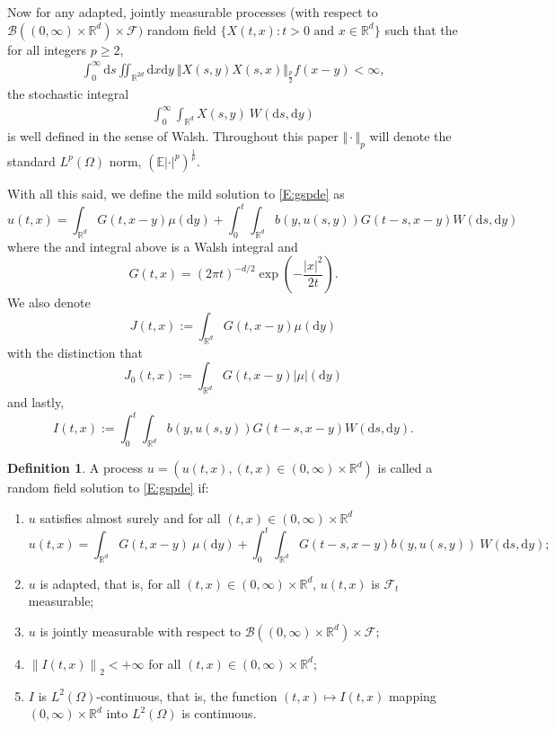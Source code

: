 \documentclass[a4paper,11pt]{article}%
\numberwithin{equation}{section}
\theoremstyle{plain}
\theoremstyle{definition}
\newtheorem{definition}[theorem]{Definition}
\newcommand{\R}{\mathbb{R}}
\newcommand{\E}{\mathbb{E}}
\newcommand{\Norm}[1]{\left\|  #1   \right\|}
\newcommand{\ud}{\ensuremath{ \mathrm{d} }}
\begin{document}
Now for any adapted, jointly measurable processes (with respect to $\mathcal B((0,\infty)\times \R^d)\times \mathcal F)$
random field $\{X(t,x): t>0 \text{ and } x \in \R^d\}$ such that the for all integers $p \ge 2$,
\begin{align*}
	\int_0^\infty\ud s\iint_{\R^{2d}} \ud x \ud y \: \Vert X(s,y)X(s,x) \Vert_{\frac{p}{2}}f(x-y) < \infty,
\end{align*}
the stochastic integral
\begin{align*}
	\int_0^\infty \int_{\R^d} X(s,y)\: W(\ud s, \ud y)
\end{align*}
is well defined in the sense of Walsh. Throughout this paper $\Vert \cdot \Vert_p$ will denote the standard
$L^p(\Omega)$ norm, $\left(\E|\cdot|^p\right)^{\frac{1}{p}}$.

With all this said, we define the mild solution to \eqref{E:gspde} as
\begin{equation}
u(t,x)=\int_{\R^d}G(t,x-y)\mu(\ud y) + \int_0^t\int_{\R^d}b(y,u(s,y))G(t-s,x-y)W(\ud s,\ud y) \label{E:gmsol}
\end{equation}
where the and integral above is a Walsh integral and
\[
G(t,x) = (2 \pi t)^{-d/2}\exp\left( -\dfrac{|x|^2}{2t} \right).
\]
We also denote
\[
J(t,x) := \int_{\R^d}G(t,x-y)\mu(\ud y)
\]
with the distinction that
\[
J_0(t,x) := \int_{\R^d}G(t,x-y)|\mu|(\ud y)
\]
and lastly,
\[
I(t,x):= \int_0^t\int_{\R^d}b(y,u(s,y))G(t-s,x-y)W(\ud s,\ud y).
\]
\begin{definition}
	\label{D:Sol}
	A process $u=(u(t,x),(t,x)\in (0,\infty)\times \R^d)$ is called a random field solution to \eqref{E:gspde} if:
	\begin{enumerate}
		\item $u$ satisfies almost surely and for all $(t,x) \in (0,\infty)\times \R^d$
		\[
		u(t,x) = \int_{\R^d}G(t,x-y)\:\mu( \ud y) +
		\int_0^t\int_{\R^d}G(t-s,x-y)b(y,u(s,y)) \:
		W(\ud s, \ud y);
		\]
		\item $u$ is adapted, that is, for all $(t,x) \in (0,\infty)\times \R^d$, $u(t,x)$ is $\mathcal F_t$ measurable;
		\item $u$ is jointly measurable with respect to $\mathcal B((0,\infty)\times \R^d) \times \mathcal F$;
		\item $\Norm{I(t,x)}_2 < + \infty $ for all $(t,x) \in (0,\infty)\times \R^d$;
		\item $I$ is $L^2(\Omega)$-continuous, that is, the function $(t,x) \mapsto I(t,x)$ mapping $(0,\infty)\times \R^d$ into $L^2(\Omega)$ is continuous.
	\end{enumerate}
\end{definition}
\end{document}
